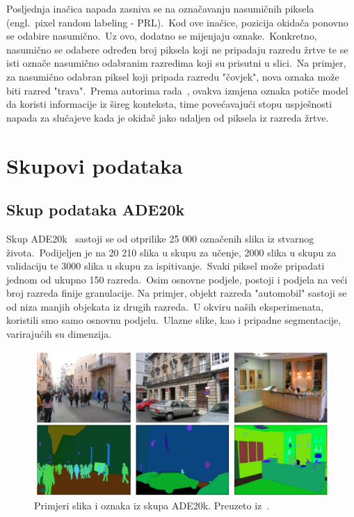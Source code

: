 \documentclass[times, utf8, seminar, numeric]{fer}
\begin{document}
Posljednja inačica napada zasniva se na označavanju nasumičnih piksela (engl.\ pixel random labeling - PRL).\
Kod ove inačice, pozicija okidača ponovno se odabire nasumično.\ Uz ovo, dodatno se mijenjaju oznake.\ 
Konkretno, nasumično se odabere određen broj piksela koji ne pripadaju razredu žrtve te se isti označe nasumično odabranim razredima koji su prisutni u slici.\ 
Na primjer, za nasumično odabran piksel koji pripada razredu "čovjek", nova oznaka može biti razred "trava".\ 
Prema autorima rada~\cite{lan2023influencer}, ovakva izmjena oznaka potiče model da koristi informacije iz šireg konteksta, time povećavajući stopu uspješnosti napada za slučajeve kada je okidač jako udaljen od piksela iz razreda žrtve.\ 

\chapter{Skupovi podataka}

\section{Skup podataka ADE20k}

Skup ADE20k~\cite{zhou2019semantic} sastoji se od otprilike 25 000 označenih slika iz stvarnog života.\ 
Podijeljen je na 20 210 slika u skupu za učenje, 2000 slika u skupu za validaciju te 3000 slika u skupu za ispitivanje.\ Svaki piksel može pripadati jednom od ukupno 150 razreda.\ 
Osim osnovne podjele, postoji i podjela na veći broj razreda finije granulacije. Na primjer, objekt razreda "automobil" sastoji se od niza manjih objekata iz drugih razreda.\ 
U okviru naših eksperimenata, koristili smo samo osnovnu podjelu.\ Ulazne slike, kao i pripadne segmentacije, varirajućih su dimenzija.\ 
  
\begin{figure}[htb]
    \centering
    \includegraphics[scale=1.5]{./Slike/ade20k.png}
    \caption{Primjeri slika i oznaka iz skupa ADE20k. Preuzeto iz~\cite{zhou2019semantic}.}
    \label{fig:ade20k}
\end{figure}
\end{document}
